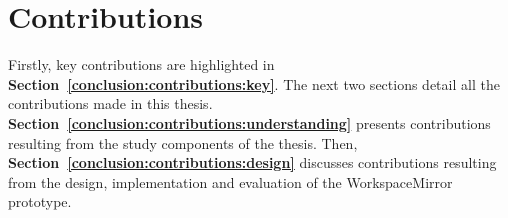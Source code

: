 
\newpage
\section{Contributions}
\label{conclusion:contributions}
Firstly, key contributions are highlighted in \textbf{Section~\ref{conclusion:contributions:key}}. The next two sections detail all the contributions made in this thesis.  \textbf{Section~\ref{conclusion:contributions:understanding}} presents contributions resulting from the study components of the thesis.  Then, \textbf{Section~\ref{conclusion:contributions:design}} discusses contributions resulting from the design, implementation and evaluation of the WorkspaceMirror prototype.

